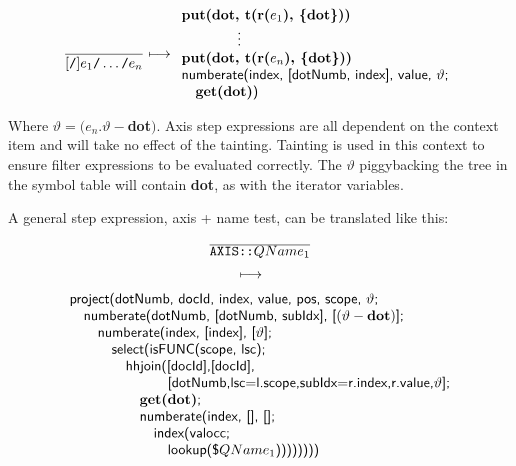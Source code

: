 \begin{equation}
\frac{}{[\mbox{\texttt{/}}]e_1\mbox{\texttt{/}}\ldots\mbox{\texttt{/}}e_n} \longmapsto
\begin{array}{l}
\mbox{\textbf{put(dot, t(r(}}e_1\mbox{\textbf{), \{dot\}))}} \\
\qquad \qquad \vdots \\
\mbox{\textbf{put(dot, t(r(}}e_n\mbox{\textbf{), \{dot\}))}} \\
\mbox{\textsf{numberate(index, [dotNumb, index], value, }}\vartheta\mbox{\textsf{;}} \\ \quad
\mbox{\textbf{get(dot)}\textsf{)}}
\end{array}
\label{rule:trans:TD:pathExpr}
\end{equation} 

Where $\vartheta = (e_n.\vartheta-$\textbf{dot}$)$. Axis step expressions are all dependent on the context item and
will take no effect of the tainting. Tainting is used in this context to ensure filter expressions to be evaluated
correctly. The $\vartheta$ piggybacking the tree in the symbol table will contain \textbf{dot}, as with
the iterator variables.

A general step expression, axis + name test, can be translated like this:
\begin{equation}
\begin{array}{c}
\frac{}{\displaystyle \texttt{AXIS::}QName_1} \\ 
\longmapsto \begin{array}{c}\mbox{\tiny } \\ \mbox{\tiny } \end{array} \\
\begin{array}{l}
\mbox{\textsf{project(dotNumb, docId, index, value, pos, scope, }}\vartheta\mbox{\textsf{;}} \\ \quad
\mbox{\textsf{numberate(dotNumb, [dotNumb, subIdx], [}}(\vartheta-\mbox{\textbf{dot}})\mbox{\textsf{];}} \\
\quad\quad 
\mbox{\textsf{numberate(index, [index], [}}\vartheta\mbox{\textsf{];}} \\ \quad\quad\quad
\mbox{\textsf{select(isFUNC(scope, lsc);}} \\ \quad \quad\quad\quad
\mbox{\textsf{hhjoin([docId],[docId],}} \\ \quad\quad\quad\quad\quad\quad\quad
\mbox{\textsf{[dotNumb,lsc=l.scope,subIdx=r.index,r.value,}}\vartheta\mbox{\textsf{];}}\\
\quad\quad\quad\quad\quad \mbox{\textbf{get(dot)}\textsf{;}} \\ \quad \quad\quad \quad\quad
\mbox{\textsf{numberate(index, [], [];}}\\ \quad\quad\quad\quad\quad\quad
\mbox{\textsf{index(valocc;}} \\ \quad\quad\quad\quad\quad\quad\quad
\mbox{\textsf{lookup(\$}}QName_1\mbox{\textsf{))))))))}}
\end{array}
\end{array}
\label{rule:trans:TD:pathStep}
\end{equation}

